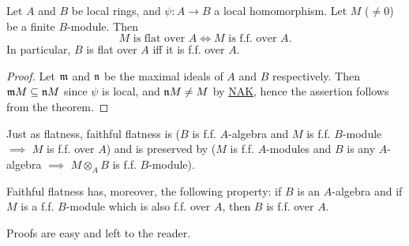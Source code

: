 \documentclass[../main]{subfiles}
\begin{document}
\begin{corollary}\label{cor:04.01}
    Let $A$ and $B$ be local rings, and $\psi : A \longrightarrow B$ a local homomorphism. Let $M$ ($\ne 0$) be a finite $B$-module. Then \[ M\text{ is flat over }A \iff M\text{ is f.f. over }A.\] In particular, $B$ is flat over $A$ iff it is f.f. over $A$.
\end{corollary}
\begin{proof}
    Let $\mathfrak{m}$ and $\mathfrak{n}$ be the maximal ideals of $A$ and $B$ respectively. Then \newline $\mathfrak{m}M \subseteq \mathfrak{n}M$ since $\psi$ is local, and $\mathfrak{n}M \ne M$ by \hyperref[NAK]{NAK}, hence the assertion follows from the theorem.
\end{proof}

\newparagraph Just as flatness, faithful flatness is  ($B$ is f.f. $A$-algebra and $M$ is f.f. $B$-module $\implies$ $M$ is f.f. over $A$) and is preserved by  ($M$ is f.f. $A$-modules and $B$ is any $A$-algebra $\implies$ $M\otimes_A B$ is f.f. $B$-module).

Faithful flatness has, moreover, the following  property: if $B$ is an $A$-algebra and if $M$ is a f.f. $B$-module which is also f.f. over $A$, then $B$ is f.f. over $A$.

Proofs are easy and left to the reader.
\end{document}
